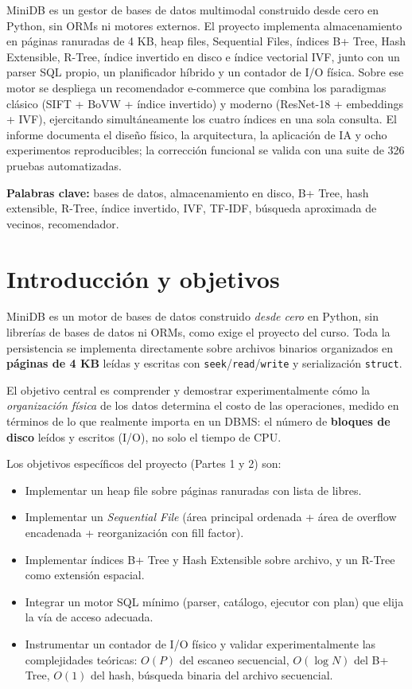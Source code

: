 \documentclass[11pt]{article}
\begin{document}
MiniDB es un gestor de bases de datos multimodal construido desde cero en
Python, sin ORMs ni motores externos. El proyecto implementa almacenamiento
en páginas ranuradas de 4 KB, heap files, Sequential Files, índices B+ Tree,
Hash Extensible, R-Tree, índice invertido en disco e índice vectorial IVF,
junto con un parser SQL propio, un planificador híbrido y un contador de I/O
física. Sobre ese motor se despliega un recomendador e-commerce que combina
los paradigmas clásico (SIFT + BoVW + índice invertido) y moderno (ResNet-18
+ embeddings + IVF), ejercitando simultáneamente los cuatro índices en una
sola consulta. El informe documenta el diseño físico, la arquitectura, la
aplicación de IA y ocho experimentos reproducibles; la corrección funcional
se valida con una suite de 326 pruebas automatizadas.

\textbf{Palabras clave:} bases de datos, almacenamiento en disco, B+ Tree,
hash extensible, R-Tree, índice invertido, IVF, TF-IDF, búsqueda
aproximada de vecinos, recomendador.

\section{Introducción y objetivos}

MiniDB es un motor de bases de datos construido \emph{desde cero} en Python,
sin librerías de bases de datos ni ORMs, como exige el proyecto del curso.
Toda la persistencia se implementa directamente sobre archivos binarios
organizados en \textbf{páginas de 4 KB} leídas y escritas con
\texttt{seek}/\texttt{read}/\texttt{write} y serialización \texttt{struct}.

El objetivo central es comprender y demostrar experimentalmente cómo la
\emph{organización física} de los datos determina el costo de las operaciones,
medido en términos de lo que realmente importa en un DBMS: el número de
\textbf{bloques de disco} leídos y escritos (I/O), no solo el tiempo de CPU.

Los objetivos específicos del proyecto (Partes 1 y 2) son:

\begin{itemize}
  \item Implementar un heap file sobre páginas ranuradas con lista de libres.
  \item Implementar un \emph{Sequential File} (área principal ordenada + área
        de overflow encadenada + reorganización con fill factor).
  \item Implementar índices B+ Tree y Hash Extensible sobre archivo,
        y un R-Tree como extensión espacial.
  \item Integrar un motor SQL mínimo (parser, catálogo, ejecutor con plan)
        que elija la vía de acceso adecuada.
  \item Instrumentar un contador de I/O físico y validar experimentalmente
        las complejidades teóricas: $O(P)$ del escaneo secuencial,
        $O(\log N)$ del B+ Tree, $O(1)$ del hash, búsqueda binaria del
        archivo secuencial.
\end{itemize}
\end{document}
